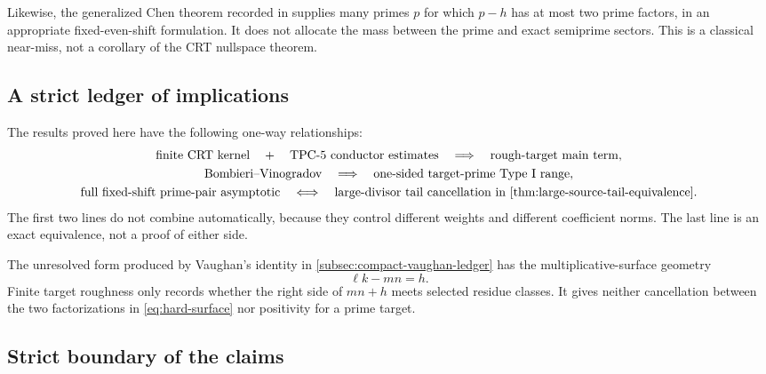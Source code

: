 Likewise, the generalized Chen theorem recorded in
\citet[Theorem~25.11]{FriedlanderIwaniec2010} supplies many primes $p$ for which
$p-h$ has at most two prime factors, in an appropriate fixed-even-shift
formulation.  It does not allocate the mass between the prime and exact
semiprime sectors.  This is a classical near-miss, not a corollary of the CRT
nullspace theorem.

\subsection{A strict ledger of implications}

The results proved here have the following one-way relationships:
\begin{equation}\label{eq:implication-ledger}
\begin{gathered}
\text{finite CRT kernel}
\quad+\quad
\text{TPC-5 conductor estimates}
\quad\Longrightarrow\quad
\text{rough-target main term},\\
\text{Bombieri--Vinogradov}
\quad\Longrightarrow\quad
\text{one-sided target-prime Type~I range},\\
\text{full fixed-shift prime-pair asymptotic}
\quad\Longleftrightarrow\quad
\text{large-divisor tail cancellation in \cref{thm:large-source-tail-equivalence}}.
\end{gathered}
\end{equation}
The first two lines do not combine automatically, because they control
different weights and different coefficient norms.  The last line is an
exact equivalence, not a proof of either side.

The unresolved form produced by Vaughan's identity in
\cref{subsec:compact-vaughan-ledger} has the multiplicative-surface geometry
\begin{equation}\label{eq:hard-surface}
 \ell k-mn=h.
\end{equation}
Finite target roughness only records whether the right side of $mn+h$ meets
selected residue classes.  It gives neither cancellation between the two
factorizations in \eqref{eq:hard-surface} nor positivity for a prime target.

\subsection{Strict boundary of the claims}

